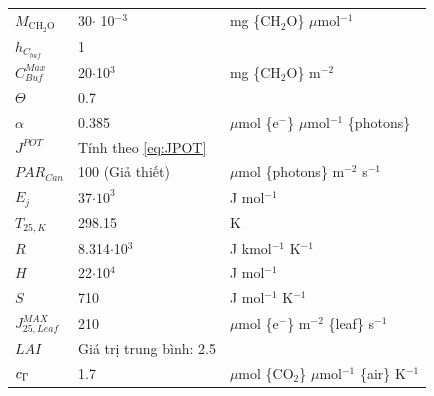 \documentclass[a4paper]{article}
\begin{document}
\begin{longtable}{l p{} l }
$M_{\mathrm{CH_2O}}$        & 30$\cdot$ 10$^{-3}$    & mg \{$\mathrm{CH_2O}$\} $\mu$mol$^{-1}$   \\
$h_{{C}_{buf}}$             & 1                     &                                   \\
$C^{Max}_{Buf}$             & 20$\cdot$10$^3$       & mg \{$\mathrm{CH_2O}$\} m$^{-2}$ \\
$\Theta$                    & 0.7                   &                                   \\
$\alpha$                    & 0.385                 & $\mu$mol \{e$^{-}$\} $\mu$mol$^{-1}$ \{photons\} \\
$J^{POT}$                   & Tính theo \eqref{eq:JPOT} &                               \\
$PAR_{Can}$                 & 100 (Giả thiết)       & $\mu$mol \{photons\} m$^{-2}$ s$^{-1}$\\
$E_j$                       & 37$\cdot10^3$         & J mol$^{-1}$                      \\
$T_{25,K}$                  & 298.15                & K                                 \\
$R$                         & 8.314$\cdot$10$^3$    & J kmol$^{-1}$ K$^{-1}$             \\
$H$                         & 22$\cdot$10$^4$       & J mol$^{-1}$                      \\
$S$                         & 710                   & J mol$^{-1}$ K$^{-1}$             \\
$J^{MAX}_{25,Leaf}$         & 210                   & $\mu$mol \{e$^{-}$\} m$^{-2}$ \{leaf\} s$^{-1}$ \\
$LAI$                       &Giá trị trung bình: 2.5&                                   \\
$c_{\footnotesize{\Gamma}}$ & 1.7                   & $\mu$mol \{$\mathrm{CO_2}$\} $\mu$mol$^{-1}$ \{air\} K$^{-1}$ \\


\end{longtable}
\end{document}
